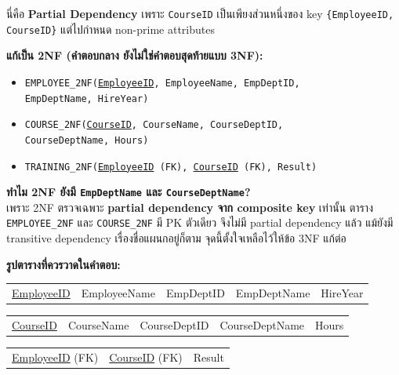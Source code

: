 \documentclass[a4paper,12pt]{article}
\newcommand{\pk}[1]{\uline{#1}}
\newcommand{\schema}[1]{\texttt{#1}}
\begin{document}
นี่คือ \textbf{Partial Dependency} เพราะ \schema{CourseID} เป็นเพียงส่วนหนึ่งของ key \schema{\{EmployeeID, CourseID\}} แต่ไปกำหนด non-prime attributes

\textbf{แก้เป็น 2NF (คำตอบกลาง ยังไม่ใช่คำตอบสุดท้ายแบบ 3NF):}
\begin{itemize}
    \item \schema{EMPLOYEE\_2NF(\pk{EmployeeID}, EmployeeName, EmpDeptID,}\\
    \schema{EmpDeptName, HireYear)}
    \item \schema{COURSE\_2NF(\pk{CourseID}, CourseName, CourseDeptID,}\\
    \schema{CourseDeptName, Hours)}
    \item \schema{TRAINING\_2NF(\pk{EmployeeID} (FK), \pk{CourseID} (FK), Result)}
\end{itemize}

\noindent\textbf{ทำไม 2NF ยังมี \schema{EmpDeptName} และ \schema{CourseDeptName}?}\\
เพราะ 2NF ตรวจเฉพาะ \textbf{partial dependency จาก composite key} เท่านั้น ตาราง \schema{EMPLOYEE\_2NF} และ \schema{COURSE\_2NF} มี PK ตัวเดียว จึงไม่มี partial dependency แล้ว แม้ยังมี transitive dependency เรื่องชื่อแผนกอยู่ก็ตาม จุดนี้ตั้งใจเหลือไว้ให้ข้อ 3NF แก้ต่อ

\textbf{รูปตารางที่ควรวาดในคำตอบ:}
\begin{center}
\renewcommand{\arraystretch}{1.15}
\scriptsize
\begin{tabular}{|c|c|c|c|c|}
    \hline
    \rowcolor{cyan!15}
    \multicolumn{5}{|c|}{\textbf{EMPLOYEE\_2NF}} \\
    \hline
    \pk{EmployeeID} & EmployeeName & EmpDeptID & EmpDeptName & HireYear \\
    \hline
\end{tabular}
\end{center}

\begin{center}
\renewcommand{\arraystretch}{1.15}
\scriptsize
\begin{tabular}{|c|c|c|c|c|}
    \hline
    \rowcolor{cyan!15}
    \multicolumn{5}{|c|}{\textbf{COURSE\_2NF}} \\
    \hline
    \pk{CourseID} & CourseName & CourseDeptID & CourseDeptName & Hours \\
    \hline
\end{tabular}
\end{center}

\begin{center}
\renewcommand{\arraystretch}{1.15}
\small
\begin{tabular}{|c|c|c|}
    \hline
    \rowcolor{cyan!15}
    \multicolumn{3}{|c|}{\textbf{TRAINING\_2NF}} \\
    \hline
    \pk{EmployeeID} (FK) & \pk{CourseID} (FK) & Result \\
    \hline
\end{tabular}
\end{center}
\end{document}
